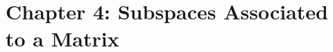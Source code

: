 \documentclass[11pt]{article}
\begin{document}
\begin{comment}
\sectiontitle{3.8 Transition Matrices}

\defn{Let $V$ be a subspace of \R{n}. Suppose $S=\{\Bf{u}_{1},\dots,\Bf{u}_{k}\}$ and $T=\{\Bf{v}_{1},\dots,\Bf{v}_{k}\}$ are \textbf{basis} for the subspace $V$. Define the \textbf{transition matrix} from \textbf{$T$ to $S$} to be \[\mathbf{P}=(\;[\mathbf{v}_{1}]_{S}\q[\mathbf{v}_{2}]_{S}\q\dots\q[\mathbf{v}_{k}]_{S}\;),\]the matrix whose columns are the coordinates of the vectors in $T$ relative to the basis $S$.}

\theo{(Transition Matrix) \\ \\
Let $V$ be a subspace of \R{n}. Suppose $S =  \{ \Bf{u}_{1}  ,\dots, \Bf{u}_{k} \}$ and $T=\{\Bf{v}_{1},\dots,\Bf{v}_{k}\}$ are \textbf{bases} for the subspace $V$. Let \textbf{P} be the transition matrix from \textbf{$T$ to $S$}. Then for any vector $w$ in $V$, \[ [\mathbf{w}]_{S} = \mathbf{P}[\mathbf{w}]_{T}. \] }

\algo{to find Transition Matrix}{ Let $S=\{\Bf{u}_{1},\dots,\Bf{u}_{k}\}$ and $T=\{\Bf{v}_{1},\dots,\Bf{v}_{k}\}$ be basis for a subspace $V$ in \R{n}. To find \textbf{P}, the transition matrix from $T$ to $S$, \[(``S''|``T'') = (\Bf{u}_{1}\q \Bf{u}_{2}\q \dots \q\Bf{u}_{k}\q|\q \Bf{v}_{1}\q \Bf{v}_{2}\q\dots \Bf{v}_{k} \q) \xrightarrow{\text{rref}} \left(\q \begin{matrix}\mathbf{I}_{k}\\ \mathbf{0}_{(n-k)\times k}  \end{matrix}\q \middle|\q \begin{matrix}\mathbf{P}\\ \mathbf{0}_{(n-k)\times k}  \end{matrix}\q \right)  \]}

\theo{(Inverse of Transition Matrix) \\ \\ 
Suppose $S = \{ \Bf{u}_{1},\dots, \Bf{u}_{k}\}$ and $T = \{ \Bf{v}_{1},\dots, \Bf{v}_{k} \}$ are \textbf{bases} for a subspace $V$ of \R{n}. Let \textbf{P} be the \textbf{transition matrix from $T$ to $S$}. Then $\Bf{P}^{-1}$ is the \textbf{transition matrix from $S$ to $T$}.}

\end{comment} 


\chapter{Chapter 4: Subspaces Associated to a Matrix}
\end{document}
